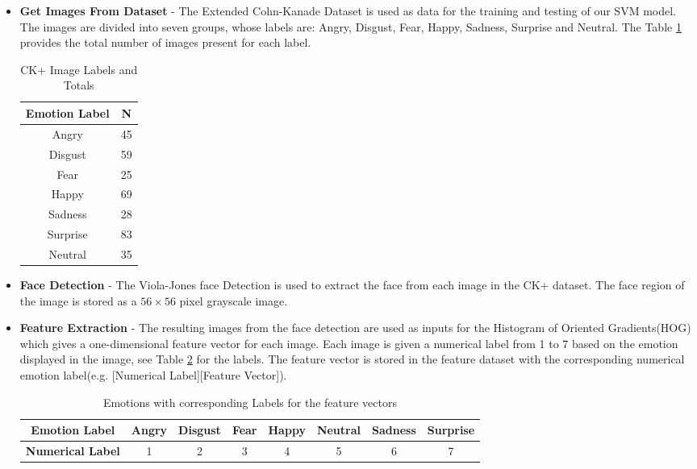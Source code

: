 \begin{itemize}
  \item \textbf{Get Images From Dataset} - The Extended Cohn-Kanade Dataset\citep{ck} is used as data for the training and testing of our SVM model. The images are divided into seven groups, whose labels are: Angry, Disgust, Fear, Happy, Sadness, Surprise and Neutral. The Table \ref{table:1} provides the total number of images present for each label.

\begin{table}[H]
\centering
\begin{tabular}{ |c||c|}	
	\hline
	\textbf{Emotion Label} & \textbf{N}  \\
	\hline 
	Angry & 45 \\ 
	Disgust & 59 \\ 
	Fear & 25 \\ 
	Happy & 69 \\ 
	Sadness & 28 \\ 
	Surprise & 83 \\  
	Neutral & 35 \\
	\hline  
\end{tabular}
\caption{CK+ Image Labels and Totals}
\label{table:1}
\end{table}

  \item \textbf{Face Detection} - The Viola-Jones face Detection is used to extract the face from each image in the CK+ dataset. The face region of the image is stored as a $56 \times 56$ pixel grayscale image. 
  
  \item \textbf{Feature Extraction} - The resulting images from the face detection are used as inputs for the Histogram of Oriented Gradients(HOG) which gives a one-dimensional feature vector for each image. Each image is given a numerical label from 1 to 7 based on the emotion displayed in the image, see Table \ref{table:22} for the labels. The feature vector is stored in the feature dataset with the corresponding numerical emotion label(e.g. [Numerical Label][Feature Vector]). 
\begin{table}[H]
\centering
\begin{tabular}{ |c||c|c|c|c|c|c|c|}
	\hline
	\textbf{Emotion Label}  & Angry & Disgust & Fear & Happy & Neutral & Sadness & Surprise \\ 
	\hline
	\textbf{Numerical Label} & 1 & 2 & 3 & 4 & 5 & 6 & 7   \\ 
	\hline
\end{tabular}   
\caption{Emotions with corresponding Labels for the feature vectors}
\label{table:22}
\end{table}


\end{itemize}
